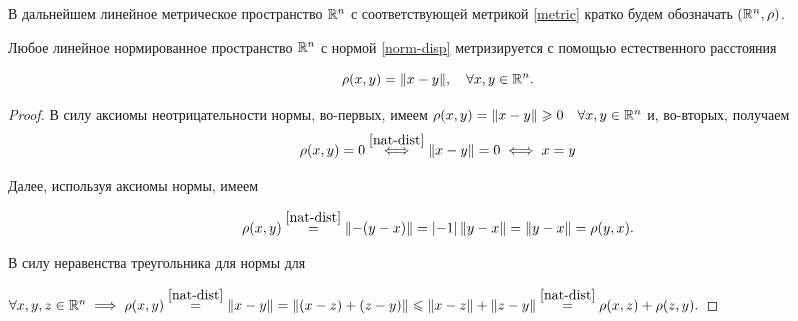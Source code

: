 \documentclass[../../main.tex]{subfiles}
\begin{document}
В дальнейшем линейное метрическое пространство $\mathbb{R}^n$ с 
соответствующей метрикой \eqref{metric} кратко будем обозначать
$\left(\mathbb{R}^n, \rho\right)$.

\begin{thm}
 Любое линейное нормированное пространство $\mathbb{R}^n$ с нормой
 \eqref{norm-disp} метризируется с помощью естественного расстояния

 \begin{equation}
  \label{nat-dist}
  \rho(x, y) = \lVert{x-y}\rVert,\quad \forall x, y \in \mathbb{R}^n.
 \end{equation}
 
\end{thm}

\begin{proof}
 В силу аксиомы неотрицательности нормы, во-первых, имеем $\rho(x, y) 
 = \lVert{x-y}\rVert \geqslant 0 \quad \forall x, y \in \mathbb{R}^n$ и, во-вторых, получаем
 \[\rho(x, y) = 0 \stackrel{\eqref{nat-dist}}{\iff} \lVert{x-y}\rVert = 0 
  \iff x = y\]
 
 Далее, используя аксиомы нормы, имеем
 
 \[\rho(x, y) \stackrel{\eqref{nat-dist}}{=} \lVert{-(y-x)}\rVert =
   \left|{-1}\right|\lVert{y-x}\rVert = \lVert{y-x}\rVert = \rho(y, x).\]
 
 В силу неравенства треугольника для нормы для
 
 $\forall x, y, z \in \R^n \implies \rho(x, y) \stk{nat-dist}{=} 
  \norm{x-y} = \norm{(x-z) + (z-y)} \le
  \norm{x-z} + \norm{z-y} \stk{nat-dist}{=} \rho(x, z) +  \rho(z, y).$
\end{proof}
\end{document}
